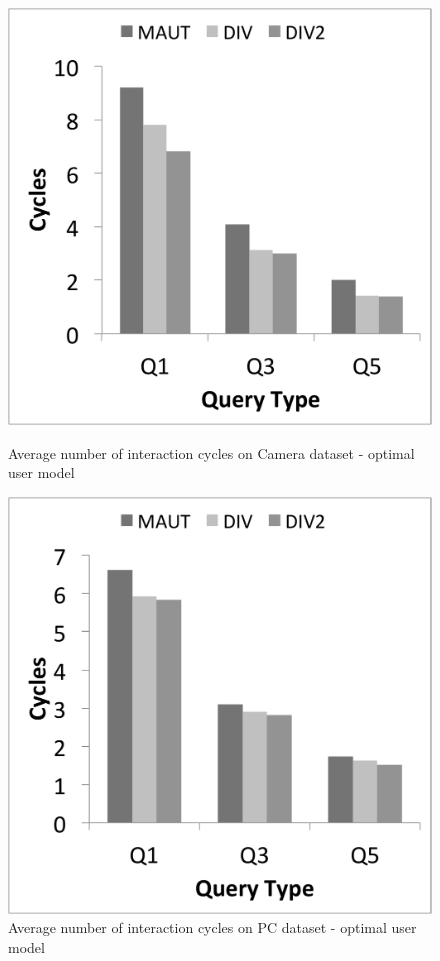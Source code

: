 \begin{figure}[h]
\centering
\begin{minipage}{.45\textwidth}
  \centering
  \includegraphics[width=1\linewidth]{figures-bharath/div_camera_opt}
  \caption[]{Average number of interaction cycles on Camera dataset - optimal user model}
  \label{fig:div_camera_opt}
\end{minipage}%
\;\;\;\;\;\;
\begin{minipage}{.45\textwidth}
  \centering
  \includegraphics[width=1\linewidth]{figures-bharath/div_pc_opt}
  \caption[]{Average number of interaction cycles on PC dataset - optimal user model}
  \label{fig:div_pc_opt}
\end{minipage}
\end{figure}

